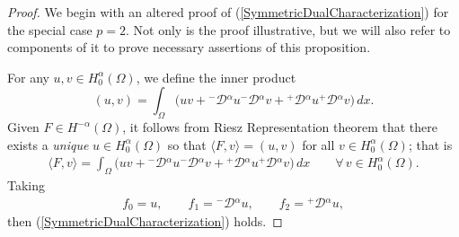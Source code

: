 \documentclass[leqno,final]{siamltex}
\numberwithin{equation}{section}
\renewcommand{\(}{\bigl(}
\renewcommand{\)}{\bigr)}
\begin{document}
   \begin{proof}
   We begin with an altered proof of (\ref{SymmetricDualCharacterization}) for the special case $p=2$. Not only is the proof illustrative, but we will also refer to components of it to prove necessary assertions of this proposition. 
   
   For any $u , v \in H^{\alpha}_{0}(\Omega)$, we define the inner product 
   \[
   (u,v) = \int_{\Omega} \bigl( uv + {^{-}}{\mathcal{D}}{^{\alpha}} u {^{-}}{\mathcal{D}}{^{\alpha}} v + {^{+}}{\mathcal{D}}{^{\alpha}} u {^{+}}{\mathcal{D}}{^{\alpha}} v \bigr)\,dx.
   \]
   Given $F \in H^{-\alpha}(\Omega)$, it follows from Riesz Representation theorem 
   that there exists a \textit{unique} $u \in H^{\alpha}_{0}(\Omega)$ so that 
   $\langle F , v \rangle = (u,v)$ for all $v \in H^{\alpha}_{0}(\Omega)$; that is 
   \begin{align}\label{Riesz1}
       \langle F , v \rangle =\int_{\Omega} \bigl( uv + {^{-}}{\mathcal{D}}{^{\alpha}} u {^{-}}{\mathcal{D}}{^{\alpha}} v + {^{+}}{\mathcal{D}}{^{\alpha}} u {^{+}}{\mathcal{D}}{^{\alpha}} v \bigr) \,dx \qquad \forall\, v \in H^{\alpha}_{0}(\Omega).
   \end{align}
   Taking 
   \begin{align}\label{Riesz2}
     f_0 = u,\qquad f_1 = {^{-}}{\mathcal{D}}{^{\alpha}} u,\qquad
      f_2 = {^{+}}{\mathcal{D}}{^{\alpha}} u,
   \end{align}
   then (\ref{SymmetricDualCharacterization}) holds. 
   

\end{proof}
\end{document}
